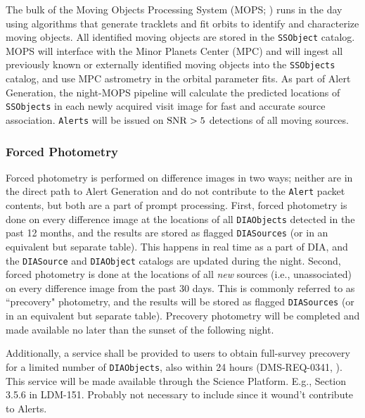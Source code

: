 The bulk of the Moving Objects Processing System (MOPS; ) runs in the day using algorithms that generate tracklets and fit orbits to identify and characterize moving objects.
All identified moving objects are stored in the {\tt SSObject} catalog.
MOPS will interface with the Minor Planets Center (MPC) and will ingest all previously known or externally identified moving objects into the {\tt SSObjects} catalog, and use MPC astrometry in the orbital parameter fits.
As part of Alert Generation, the night-MOPS pipeline will calculate the predicted locations of {\tt SSObjects} in each newly acquired visit image for fast and accurate source association.
{\tt Alerts} will be issued on ${\rm SNR} > 5$ detections of all moving sources.

\subsubsection{Forced Photometry}\label{sssec:AGP_force}

Forced photometry is performed on difference images in two ways; neither are in the direct path to Alert Generation and do not contribute to the {\tt Alert} packet contents, but both are a part of prompt processing.
First, forced photometry is done on every difference image at the locations of all {\tt DIAObjects} detected in the past 12 months, and the results are stored as flagged {\tt DIASources} (or in an equivalent but separate table).
This happens in real time as a part of DIA, and the {\tt DIASource} and {\tt DIAObject} catalogs are updated during the night.
Second, forced photometry is done at the locations of all {\em new} sources (i.e., unassociated) on every difference image from the past 30 days.
This is commonly referred to as ``precovery" photometry, and the results will be stored as flagged {\tt DIASources} (or in an equivalent but separate table).
Precovery photometry will be completed and made available no later than the sunset of the following night.
 
Additionally, a service shall be provided to users to obtain full-survey precovery for a limited number of {\tt DIAObjects}, also within 24 hours (DMS-REQ-0341, ).
This service will be made available through the Science Platform.
E.g., Section 3.5.6 in LDM-151.
Probably not necessary to include since it wound't contribute to Alerts.


